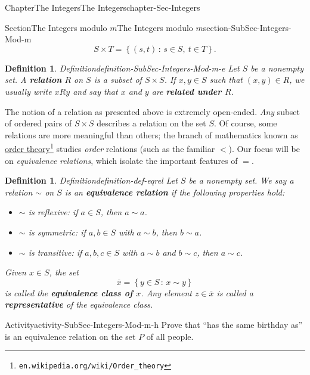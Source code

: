 \documentclass[oneside,10pt,]{book}
\newcommand{\terminology}[1]{\textbf{#1}}
\numberwithin{equation}{section}
\newcommand{\setof}[2]{{\left\{#1\,\colon\,#2\right\}}}
\newtheorem{definition}[theorem]{Definition}
\newcommand{\lt}{<}
\begin{document}
\begin{chapterptx}{Chapter}{The Integers}{}{The Integers}{}{}{chapter-Sec-Integers}
\begin{sectionptx}{Section}{The Integers modulo \(m\)}{}{The Integers modulo \(m\)}{}{}{section-SubSec-Integers-Mod-m}
\begin{equation*}
S\times T = \setof{(s,t)}{s\in S, \ t\in T}.
\end{equation*}
\begin{definition}{Definition}{}{definition-SubSec-Integers-Mod-m-e}%
%
Let \(S\) be a nonempty set. A \terminology{relation} \(R\) on \(S\) is a subset of \(S\times S\). If \(x,y\in S\) such that \((x,y)\in R\), we usually write \(xRy\) and say that \(x\) and \(y\) are \terminology{related under \(R\)}.%
\end{definition}
The notion of a relation as presented above is extremely open-ended. \emph{Any} subset of ordered pairs of \(S\times S\) describes a relation on the set \(S\). Of course, some relations are more meaningful than others; the branch of mathematics known as \href{https://en.wikipedia.org/wiki/Order_theory}{order theory}\footnote{\nolinkurl{en.wikipedia.org/wiki/Order_theory}\label{fn-SubSec-Integers-Mod-m-f-e}} studies \emph{order} relations (such as the familiar \(\lt\)). Our focus will be on \emph{equivalence relations}, which isolate the important features of \(=\).%
\begin{definition}{Definition}{}{definition-def-eqrel}%
%
%
%
Let \(S\) be a nonempty set. We say a relation \(\sim\) on \(S\) is an \terminology{equivalence relation} if the following properties hold:%
\begin{itemize}[label=\textbullet]
\item{}\(\sim\) is \emph{reflexive}: if \(a\in S\), then \(a\sim a\).%
\item{}\(\sim\) is \emph{symmetric}: if \(a,b\in S\) with \(a\sim b\), then \(b\sim a\).%
\item{}\(\sim\) is \emph{transitive}: if \(a,b,c\in S\) with \(a\sim b\) and \(b\sim c\), then \(a\sim c\).%
\end{itemize}
%
\par
Given \(x\in S\), the set%
\begin{equation*}
\overline{x} = \setof{y\in S}{x\sim y}
\end{equation*}
is called the \terminology{equivalence class of \(x\)}. Any element \(z\in \overline{x}\) is called a \terminology{representative} of the equivalence class.%
\end{definition}
\begin{activity}{Activity}{}{activity-SubSec-Integers-Mod-m-h}%
Prove that ``has the same birthday as'' is an equivalence relation on the set \(P\) of all people.%
\end{activity}%

\end{sectionptx}
\end{chapterptx}
\end{document}
